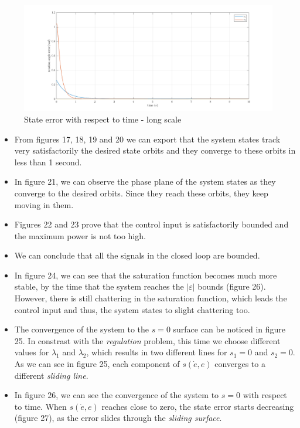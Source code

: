 \documentclass[a4paper]{article}
\begin{document}
\begin{figure}[H]
    \centering
    \includegraphics[width=15cm]{fig/sim2/elong.png}
    \caption{State error with respect to time - long scale}
\end{figure}

\begin{itemize}
    \item From figures 17, 18, 19 and 20 we can export that the system states track very satisfactorily the 
    desired state orbits and they converge to these orbits in less than 1 second.
    \item In figure 21, we can observe the phase plane of the system states as they converge to the 
    desired orbits. Since they reach these orbits, they keep moving in them.
    \item Figures 22 and 23 prove that the control input is satisfactorily bounded and the maximum power is not too high.
    \item We can conclude that all the signals in the closed loop are bounded.
    \item In figure 24, we can see that the saturation function becomes much more stable, by the time that the 
    system reaches the $| \varepsilon |$ bounds (figure 26). However, there is still chattering in the saturation function, 
    which leads the control input and thus, the system states to slight chattering too.
    \item The convergence of the system to the $s=0$ surface can be noticed in figure 25. In constrast with the 
    \textit{regulation} problem, this time we choose different values for $\lambda_1$ and $\lambda_2$, which results in two different lines for 
    $s_1=0$ and $s_2=0$. As we can see in figure 25, each component of $s(\dot{e}, e)$ converges to a different \textit{sliding line}. 
    \item In figure 26, we can see the convergence of the system to $s=0$ with respect to time. When $s(\dot{e}, e)$ reaches close to 
    zero, the state error starts decreasing (figure 27), as the error slides through the \textit{sliding surface}.
\end{itemize}
\end{document}
